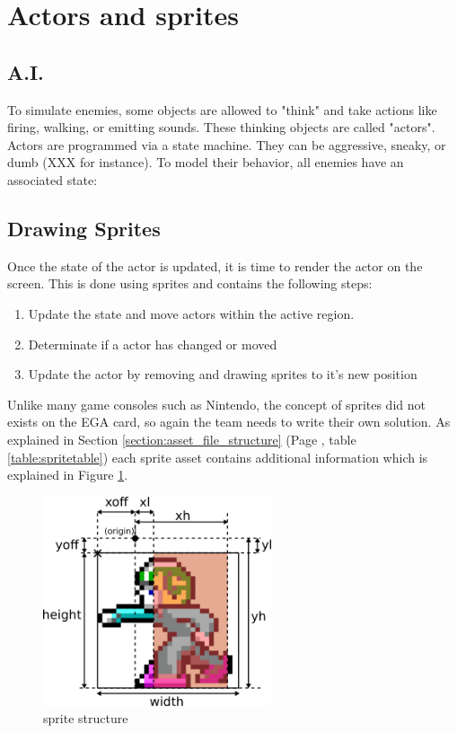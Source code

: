 \documentclass[book.tex]{subfiles}
\begin{document}
\section{Actors and sprites}

\subsection{A.I.}
To simulate enemies, some objects are allowed to "think" and take actions like firing, walking,
or emitting sounds. These thinking objects are called "actors".
Actors are programmed via a state machine. They can be aggressive, sneaky, or dumb
(XXX for instance). To model their behavior, all enemies have an associated state:

\subsection{Drawing Sprites}
\label{section:draw_sprites}
Once the state of the actor is updated, it is time to render the actor on the screen. This is done using sprites and contains the following steps:
\begin{enumerate}
\item Update the state and move actors within the active region.
\item Determinate if a actor has changed or moved
\item Update the actor by removing and drawing sprites to it's new position
\end{enumerate}

Unlike many game consoles such as Nintendo, the concept of sprites did not exists on the EGA card, so again the team needs to write their own solution. As explained in Section \ref{section:asset_file_structure} (Page \pageref{table:spritetable}, table \ref{table:spritetable}) each sprite asset contains additional information which is explained in Figure \ref{fig:sprite_structure}.\\
\begin{figure}[H]
  \centering
  \includegraphics[width=0.6\textwidth]{imgs/drawings/sprite.png}
  \caption{sprite structure}
  \label{fig:sprite_structure}
\end{figure}
\end{document}
